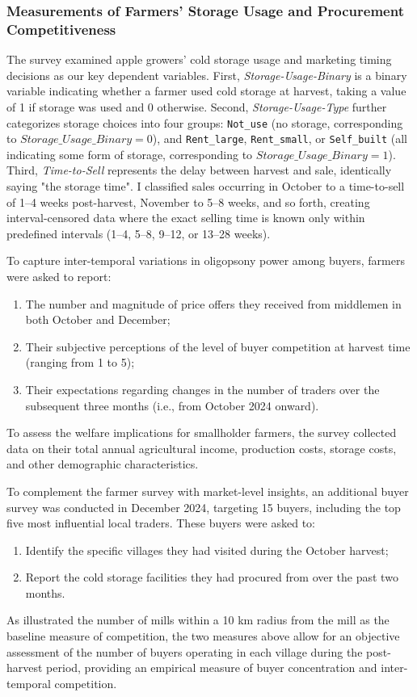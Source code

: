 \subsubsection{Measurements of Farmers' Storage Usage and Procurement Competitiveness}
\noindent The survey examined apple growers' cold storage usage and marketing timing decisions as our key dependent variables. First, \textit{Storage-Usage-Binary} is a binary variable indicating whether a farmer used cold storage at harvest, taking a value of 1 if storage was used and 0 otherwise. Second, \textit{Storage-Usage-Type} further categorizes storage choices into four groups: \texttt{Not\_use} (no storage, corresponding to $Storage\_Usage\_Binary = 0$), and \texttt{Rent\_large}, \texttt{Rent\_small}, or \texttt{Self\_built} (all indicating some form of storage, corresponding to $Storage\_Usage\_Binary = 1$). Third, \textit{Time-to-Sell} represents the delay between harvest and sale, identically saying "the storage time". I classified sales occurring in October to a time-to-sell of 1--4 weeks post-harvest, November to 5--8 weeks, and so forth, creating interval-censored data where the exact selling time is known only within predefined intervals (1--4, 5--8, 9--12, or 13--28 weeks). 

To capture inter-temporal variations in oligopsony power among buyers, farmers were asked to report:
\begin{enumerate}
    \item The number and magnitude of price offers they received from middlemen in both October and December;
    \item Their subjective perceptions of the level of buyer competition at harvest time (ranging from 1 to 5);
    \item Their expectations regarding changes in the number of traders over the subsequent three months (i.e., from October 2024 onward).
\end{enumerate}

To assess the welfare implications for smallholder farmers, the survey collected data on their total annual agricultural income, production costs, storage costs, and other demographic characteristics.

To complement the farmer survey with market-level insights, an additional buyer survey was conducted in December 2024, targeting 15 buyers, including the top five most influential local traders. These buyers were asked to:
\begin{enumerate}
    \item Identify the specific villages they had visited during the October harvest;
    \item Report the cold storage facilities they had procured from over the past two months.
\end{enumerate}
As \cite{macchiavello2021competition} illustrated the number of mills within a 10 km radius from the mill as the baseline measure of competition, the two measures above allow for an objective assessment of the number of buyers operating in each village during the post-harvest period, providing an empirical measure of buyer concentration and inter-temporal competition.



